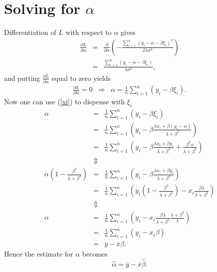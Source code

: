 \documentclass[a4paper,twoside,12pt]{article}
\begin{document}
\section{Solving for $\alpha$}
Differentiation of $L$ with respect to $\alpha$ gives
\begin{eqnarray*}
\frac{\partial L}{\partial\alpha}
&=&
\frac{\partial}{\partial\alpha}\left(
-\frac{\sum_{i=1}^n(y_i-\alpha-\beta\xi_i)^2}{2\lambda\sigma^2}\right)\\[1em]
&=&
\frac{\sum_{i=1}^n (y_i-\alpha-\beta\xi_i)}{\lambda\sigma^2},
\end{eqnarray*}
and putting $\frac{\partial L}{\partial \alpha}$ equal to zero yields
\begin{eqnarray*}%
\frac{\partial L}{\partial \alpha}=0
&\Rightarrow&
\alpha=\frac{1}{n}\sum_{i=1}^n(y_i-\beta\xi_i).
\end{eqnarray*}
Now one can use (\ref{xi}) to dispense with $\xi_i$
\begin{eqnarray*}
\alpha
&=&
\frac{1}{n}\sum_{i=1}^n(y_i-\beta\xi_i)\\[1em]
&=&
\frac{1}{n}\sum_{i=1}^n\left(y_i-\beta\frac{\lambda
  x_i+\beta(y_i-\alpha)}{\lambda+\beta^2}\right)\\[1em]
&=&
\frac{1}{n}\sum_{i=1}^n\left(y_i-\beta\frac{\lambda x_i+\beta y_i}{\lambda+\beta^2}+\frac{\beta^2\alpha}{\lambda+\beta^2}
\right)\\[1em]
&\Updownarrow&\\[1em]
\alpha\left(1-\frac{\beta^2}{\lambda+\beta^2}\right)
&=&
\frac{1}{n}\sum_{i=1}^n\left(y_i-\beta\frac{\lambda x_i+\beta y_i}{\lambda+\beta^2}
\right)\\[1em]
&=&
\frac{1}{n}\sum_{i=1}^n\left(y_i\left(1-\frac{\beta^2}{\lambda+\beta^2}\right)-x_i\frac{\beta\lambda}{\lambda+\beta^2}
\right)\\[1em]
&\Updownarrow&\\[1em]
\alpha
&=&
\frac{1}{n}\sum_{i=1}^n\left(y_i-x_i\frac{\beta\lambda}{\lambda+\beta^2}\frac{\lambda+\beta^2}{\lambda}
\right)\\[1em]
&=&
\frac{1}{n}\sum_{i=1}^n\left(y_i-x_i\beta\right)\\[1em]
&=&
\overline{y}-\overline{x}\beta.
\end{eqnarray*}
Hence the estimate for $\alpha$ becomes
$$
\hat{\alpha}=\overline{y}-\overline{x}\hat{\beta}.
$$

\end{document}
